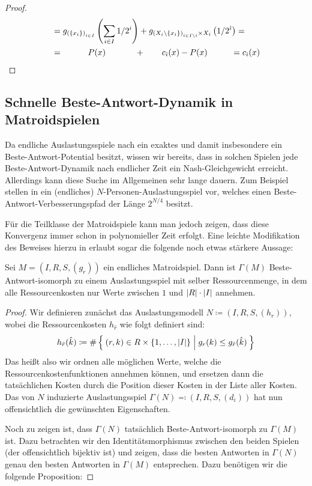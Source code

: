 \begin{proof}
\begin{align*}
	&=g_{\left(\{x_i\}\right)_{i \in I}}\left(\sum_{i \in I} 1/2^i\right) + g_{\left(X_i\setminus\{x_i\}\right)_{i \in I\setminus\hat{\imath}} \times X_{\hat{\imath}}}\left(1/2^{\hat{\imath}}\right) = \\
	&=\quad\quad\quad P(x) \quad\quad\quad~\, + \quad\quad c_{\hat{\imath}}(x) - P(x) \quad\quad~~\, = c_{\hat{\imath}}(x) \qedhere									
	\end{align*}
\end{proof}

\subsection{Schnelle Beste-Antwort-Dynamik in Matroidspielen}\label{sec:Auslastungsspiele:BADynamiken}

Da endliche Auslastungsspiele nach  ein exaktes und damit insbesondere ein Beste-Antwort-Potential besitzt, wissen wir bereits, dass in solchen Spielen jede Beste-Antwort-Dynamik nach endlicher Zeit ein Nash-Gleichgewicht erreicht. Allerdings kann diese Suche im Allgemeinen sehr lange dauern. Zum Beispiel stellen \citeauthor{BAPfadLaengeInAusl} in \cite[Theorem 3.1]{BAPfadLaengeInAusl} ein (endliches) $N$-Personen-Auslastungsspiel vor, welches einen Beste-Antwort-Verbesserungspfad der Länge $2^{N/4}$ besitzt.

Für die Teilklasse der Matroidspiele kann man jedoch zeigen, dass diese Konvergenz immer schon in polynomieller Zeit erfolgt. Eine leichte Modifikation des Beweises hierzu in \cite[Theorem 2.5]{BAPfadLaengeInAusl} erlaubt sogar die folgende noch etwas stärkere Aussage:

\begin{satz}\label{satz:BAPotentialFuerMatroidspiele}
	Sei $M = (I, R, S, (g_r))$ ein endliches Matroidspiel. Dann ist $\Gamma(M)$ Beste-Antwort-isomorph zu einem Auslastungsspiel mit selber Ressourcenmenge, in dem alle Ressourcenkosten nur Werte zwischen $1$ und $\left|R\right|\cdot\left|I\right|$ annehmen.
\end{satz}

\begin{proof}
	Wir definieren zunächst das Auslastungsmodell $N \coloneqq (I, R, S, (h_r))$, wobei die Ressourcenkosten $h_{\hat{r}}$ wie folgt definiert sind:
		\[h_{\hat{r}}(\hat{k}) \coloneqq \#\Set{(r, k) \in R\times \{1, \dots, \left|I\right|\} | g_r(k) \leq g_{\hat{r}}(\hat{k})} \]
	Das heißt also wir ordnen alle möglichen Werte, welche die Ressourcenkostenfunktionen annehmen können, und ersetzen dann die tatsächlichen Kosten durch die Position dieser Kosten in der Liste aller Kosten. Das von $N$ induzierte Auslastungsspiel $\Gamma(N) \eqqcolon (I, R, S, (d_i))$ hat nun offensichtlich die gewünschten Eigenschaften. 
	
	Noch zu zeigen ist, dass $\Gamma(N)$ tatsächlich Beste-Antwort-isomorph zu $\Gamma(M)$ ist. Dazu betrachten wir den Identitätsmorphismus zwischen den beiden Spielen (der offensichtlich bijektiv ist) und zeigen, dass die besten Antworten in $\Gamma(N)$ genau den besten Antworten in $\Gamma(M)$ entsprechen. Dazu benötigen wir die folgende Proposition:	\noqed
\end{proof}
	
